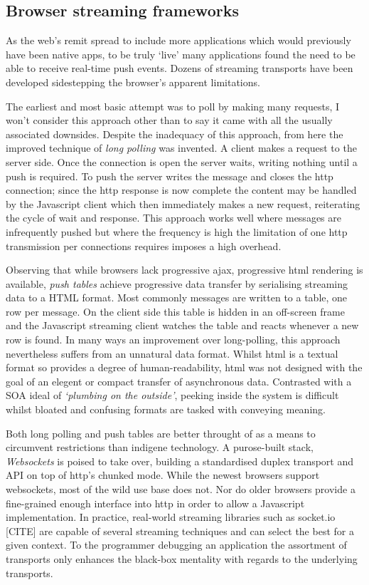 \documentclass[]{article}
\begin{document}
\subsection{Browser streaming frameworks}

As the web's remit spread to include more applications which would
previously have been native apps, to be truly `live' many applications
found the need to be able to receive real-time push events. Dozens of
streaming transports have been developed sidestepping the browser's
apparent limitations.

The earliest and most basic attempt was to poll by making many requests,
I won't consider this approach other than to say it came with all the
usually associated downsides. Despite the inadequacy of this approach,
from here the improved technique of \emph{long polling} was invented. A
client makes a request to the server side. Once the connection is open
the server waits, writing nothing until a push is required. To push the
server writes the message and closes the http connection; since the http
response is now complete the content may be handled by the Javascript
client which then immediately makes a new request, reiterating the cycle
of wait and response. This approach works well where messages are
infrequently pushed but where the frequency is high the limitation of
one http transmission per connections requires imposes a high overhead.

Observing that while browsers lack progressive ajax, progressive html
rendering is available, \emph{push tables} achieve progressive data
transfer by serialising streaming data to a HTML format. Most commonly
messages are written to a table, one row per message. On the client side
this table is hidden in an off-screen frame and the Javascript streaming
client watches the table and reacts whenever a new row is found. In many
ways an improvement over long-polling, this approach nevertheless
suffers from an unnatural data format. Whilst html is a textual format
so provides a degree of human-readability, html was not designed with
the goal of an elegent or compact transfer of asynchronous data.
Contrasted with a SOA ideal of \emph{`plumbing on the outside'}, peeking
inside the system is difficult whilst bloated and confusing formats are
tasked with conveying meaning.

Both long polling and push tables are better throught of as a means to
circumvent restrictions than indigene technology. A purose-built stack,
\emph{Websockets} is poised to take over, building a standardised duplex
transport and API on top of http's chunked mode. While the newest
browsers support websockets, most of the wild use base does not. Nor do
older browsers provide a fine-grained enough interface into http in
order to allow a Javascript implementation. In practice, real-world
streaming libraries such as socket.io {[}CITE{]} are capable of several
streaming techniques and can select the best for a given context. To the
programmer debugging an application the assortment of transports only
enhances the black-box mentality with regards to the underlying
transports.
\end{document}
